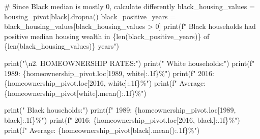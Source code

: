 \documentclass[
  letterpaper,
  DIV=11,
  numbers=noendperiod]{scrartcl}
\newenvironment{Shaded}{\begin{snugshade}}{\end{snugshade}}
\newcommand{\BuiltInTok}[1]{\textcolor[rgb]{0.00,0.23,0.31}{#1}}
\newcommand{\CharTok}[1]{\textcolor[rgb]{0.13,0.47,0.30}{#1}}
\newcommand{\CommentTok}[1]{\textcolor[rgb]{0.37,0.37,0.37}{#1}}
\newcommand{\DecValTok}[1]{\textcolor[rgb]{0.68,0.00,0.00}{#1}}
\newcommand{\NormalTok}[1]{\textcolor[rgb]{0.00,0.23,0.31}{#1}}
\newcommand{\OperatorTok}[1]{\textcolor[rgb]{0.37,0.37,0.37}{#1}}
\newcommand{\SpecialCharTok}[1]{\textcolor[rgb]{0.37,0.37,0.37}{#1}}
\newcommand{\SpecialStringTok}[1]{\textcolor[rgb]{0.13,0.47,0.30}{#1}}
\newcommand{\StringTok}[1]{\textcolor[rgb]{0.13,0.47,0.30}{#1}}
\begin{document}
\begin{Shaded}
\begin{Highlighting}[]
\CommentTok{\# Since Black median is mostly 0, calculate differently}
\NormalTok{black\_housing\_values }\OperatorTok{=}\NormalTok{ housing\_pivot[}\StringTok{\textquotesingle{}black\textquotesingle{}}\NormalTok{].dropna()}
\NormalTok{black\_positive\_years }\OperatorTok{=}\NormalTok{ black\_housing\_values[black\_housing\_values }\OperatorTok{\textgreater{}} \DecValTok{0}\NormalTok{]}
\BuiltInTok{print}\NormalTok{(}\SpecialStringTok{f"   Black households had positive median housing wealth in }\SpecialCharTok{\{}\BuiltInTok{len}\NormalTok{(black\_positive\_years)}\SpecialCharTok{\}}\SpecialStringTok{ of }\SpecialCharTok{\{}\BuiltInTok{len}\NormalTok{(black\_housing\_values)}\SpecialCharTok{\}}\SpecialStringTok{ years"}\NormalTok{)}

\BuiltInTok{print}\NormalTok{(}\StringTok{"}\CharTok{\textbackslash{}n}\StringTok{2. HOMEOWNERSHIP RATES:"}\NormalTok{)}
\BuiltInTok{print}\NormalTok{(}\StringTok{"   White households:"}\NormalTok{)}
\BuiltInTok{print}\NormalTok{(}\SpecialStringTok{f"     1989: }\SpecialCharTok{\{}\NormalTok{homeownership\_pivot}\SpecialCharTok{.}\NormalTok{loc[}\DecValTok{1989}\NormalTok{, }\StringTok{\textquotesingle{}white\textquotesingle{}}\NormalTok{]}\SpecialCharTok{:.1f\}}\SpecialStringTok{\%"}\NormalTok{)}
\BuiltInTok{print}\NormalTok{(}\SpecialStringTok{f"     2016: }\SpecialCharTok{\{}\NormalTok{homeownership\_pivot}\SpecialCharTok{.}\NormalTok{loc[}\DecValTok{2016}\NormalTok{, }\StringTok{\textquotesingle{}white\textquotesingle{}}\NormalTok{]}\SpecialCharTok{:.1f\}}\SpecialStringTok{\%"}\NormalTok{)}
\BuiltInTok{print}\NormalTok{(}\SpecialStringTok{f"     Average: }\SpecialCharTok{\{}\NormalTok{homeownership\_pivot[}\StringTok{\textquotesingle{}white\textquotesingle{}}\NormalTok{]}\SpecialCharTok{.}\NormalTok{mean()}\SpecialCharTok{:.1f\}}\SpecialStringTok{\%"}\NormalTok{)}

\BuiltInTok{print}\NormalTok{(}\StringTok{"   Black households:"}\NormalTok{)}
\BuiltInTok{print}\NormalTok{(}\SpecialStringTok{f"     1989: }\SpecialCharTok{\{}\NormalTok{homeownership\_pivot}\SpecialCharTok{.}\NormalTok{loc[}\DecValTok{1989}\NormalTok{, }\StringTok{\textquotesingle{}black\textquotesingle{}}\NormalTok{]}\SpecialCharTok{:.1f\}}\SpecialStringTok{\%"}\NormalTok{)}
\BuiltInTok{print}\NormalTok{(}\SpecialStringTok{f"     2016: }\SpecialCharTok{\{}\NormalTok{homeownership\_pivot}\SpecialCharTok{.}\NormalTok{loc[}\DecValTok{2016}\NormalTok{, }\StringTok{\textquotesingle{}black\textquotesingle{}}\NormalTok{]}\SpecialCharTok{:.1f\}}\SpecialStringTok{\%"}\NormalTok{)}
\BuiltInTok{print}\NormalTok{(}\SpecialStringTok{f"     Average: }\SpecialCharTok{\{}\NormalTok{homeownership\_pivot[}\StringTok{\textquotesingle{}black\textquotesingle{}}\NormalTok{]}\SpecialCharTok{.}\NormalTok{mean()}\SpecialCharTok{:.1f\}}\SpecialStringTok{\%"}\NormalTok{)}


\end{Highlighting}
\end{Shaded}
\end{document}
